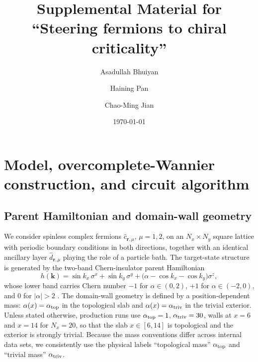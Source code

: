 \documentclass[aps,prl,onecolumn,superscriptaddress,nofootinbib]{revtex4-2}
\newcommand{\atopo}{\alpha_{\rm top}}
\newcommand{\atriv}{\alpha_{\rm triv}}
\begin{document}
\title{Supplemental Material for ``Steering fermions to chiral criticality''}

\author{Asadullah Bhuiyan}
\author{Haining Pan}
\author{Chao-Ming Jian}

\date{\today}

\maketitle
\setcounter{tocdepth}{2}
\tableofcontents

\section{Model, overcomplete-Wannier construction, and circuit algorithm}
\label{sm:model}

\subsection{Parent Hamiltonian and domain-wall geometry}

We consider spinless complex fermions $\hat c_{\bm r,\mu}$, $\mu=1,2$, on an $N_x\times N_y$ square lattice with periodic boundary conditions in both directions, together with an identical ancillary layer $\hat d_{\bm r,\mu}$ playing the role of a particle bath.  The target-state structure is generated by the two-band Chern-insulator parent Hamiltonian
\begin{equation}
  h(\bm k)=\sin k_x\,\sigma^x+\sin k_y\,\sigma^y+\big(\alpha-\cos k_x-\cos k_y\big)\sigma^z,
  \label{eq:sm-parent}
\end{equation}
whose lower band carries Chern number $-1$ for $\alpha\in(0,2)$, $+1$ for $\alpha\in(-2,0)$, and $0$ for $|\alpha|>2$ \cite{BhuiyanPanJian2026}.  The domain-wall geometry is defined by a position-dependent mass: $\alpha(x)=\atopo$ in the topological slab and $\alpha(x)=\atriv$ in the trivial exterior.  Unless stated otherwise, production runs use $\atopo=1$, $\atriv=30$, walls at $x=6$ and $x=14$ for $N_x=20$, so that the slab $x\in[6,14]$ is topological and the exterior is strongly trivial.  Because the mass conventions differ across internal data sets, we consistently use the physical labels ``topological mass'' $\atopo$ and ``trivial mass'' $\atriv$.
\end{document}

